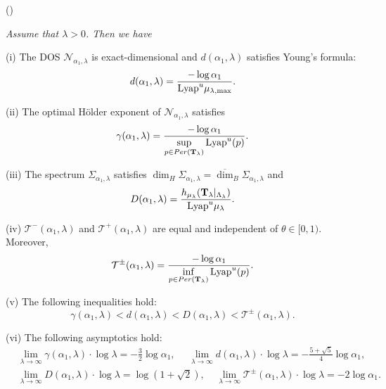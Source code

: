 \documentclass[reqno,11pt,graphicx,]{amsart}
\numberwithin{equation}{section}
\theoremstyle{plain}
\newcommand{\3}{\mathbf{3}}
\begin{document}
	\smallskip
	(\cite{DGY2016})\  {\it
		Assume that $\lambda>0$. Then we have
		
		(i) The DOS $\mathcal{N}_{\alpha_1,\lambda}$ is exact-dimensional and $d(\alpha_1,\lambda)$ satisfies Young's formula:
		\begin{equation*}\label{dim-dos-golden}
			d(\alpha_1,\lambda)=\frac{-\log \alpha_1}{{\rm Lyap}^u\mu_{\lambda,\max}}.
		\end{equation*}
		
		(ii) The optimal H\"older exponent of $\mathcal{N}_{\alpha_1,\lambda}$ satisfies 
		\begin{equation*}\label{asym-golden-gamma}
			\gamma(\alpha_1,\lambda)=\frac{-\log\alpha_1}{\sup\limits_{p\in Per(\mathbf{T}_{\lambda})}{\rm Lyap}^u(p)}.
		\end{equation*}
		
		(iii) The spectrum $\Sigma_{\alpha_1,\lambda}$ satisfies
		$
		\dim_H \Sigma_{\alpha_1,\lambda}=\overline{\dim}_B \Sigma_{\alpha_1,\lambda}
		$
		and 
		\begin{equation*}\label{asym-golden-spectra}
			D(\alpha_1,\lambda)=\frac{h_{\mu_{\lambda}}(\mathbf{T}_{\lambda}|_{\Lambda_\lambda})}{{\rm Lyap}^u\mu_{\lambda}}.
		\end{equation*}
		
		(iv) $\mathcal{T}^-(\alpha_1,\lambda)$ and $\mathcal{T}^+(\alpha_1,\lambda)$ are equal and independent of $\theta\in[0,1)$. Moreover, 
		\begin{equation*}
			\mathcal{T}^{\pm}(\alpha_1,\lambda)=\frac{-\log\alpha_1}{\inf\limits_{p\in Per(\mathbf{T}_{\lambda})}{\rm Lyap}^u(p)}.
		\end{equation*}
		
		(v) The following inequalities hold:
		\begin{equation*}
			\gamma(\alpha_1,\lambda)<d(\alpha_1,\lambda)<D(\alpha_1,\lambda)<\mathcal{T}^{\pm}(\alpha_1,\lambda).
		\end{equation*}
		
		(vi) The following asymptotics hold:
		\begin{align*}
			&\lim\limits_{\lambda\to\infty}\gamma(\alpha_1,\lambda)\cdot\log\lambda=-\frac{3}{2}\log\alpha_1,\ \ \ \ \ \ \lim\limits_{\lambda\to\infty}d(\alpha_1,\lambda)\cdot\log \lambda=-\frac{5+\sqrt{5}}{4}\log \alpha_1,\\
			&\lim_{\lambda\to \infty} D(\alpha_1,\lambda)\cdot\log \lambda=\log (1+\sqrt{2}),\ \ \ \  \  \lim\limits_{\lambda\to\infty}\mathcal{T}^{\pm}(\alpha_1,\lambda)\cdot\log\lambda=-2\log\alpha_1.
		\end{align*}
	}
	
\end{document}
